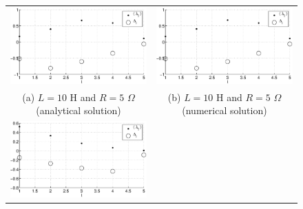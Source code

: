 \documentclass{article}[10pt]
\begin{document}
\begin{figure}[ht]
\begin{center}
\begin{tabular}{cc}
\includegraphics[scale=0.48]{IRCircuitResponseExampleL10R5_LandLCC_an.eps} &
\includegraphics[scale=0.48]{IRCircuitResponseExampleL10R5_LandLCC_num.eps} \\
(a) $L=10$ H and $R=5$ $\Omega$ (analytical solution) & (b) $L=10$ H and $R=5$ $\Omega$ (numerical solution)\\
\includegraphics[scale=0.48]{IRCircuitResponseExampleL5R20_LandLCC_an.eps} &

\end{tabular}
\end{center}
\end{figure}
\end{document}
